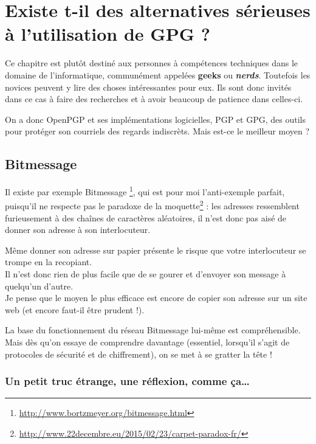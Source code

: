 \chapter{Existe t-il des alternatives sérieuses à l'utilisation de GPG ?}

\begin{notice}
	Ce chapitre est plutôt destiné aux personnes à compétences
	techniques dans le domaine de l'informatique, communément appelées
\textbf{geeks} ou \textbf{\emph{nerds}}. Toutefois les novices peuvent
y lire des choses intéressantes pour eux. Ils sont donc invités dans ce
cas à faire des recherches et à avoir beaucoup de patience dans
celles-ci.
\end{notice}


On a donc OpenPGP et ses implémentations logicielles, PGP et GPG, des
outils pour protéger son courriels des regards indiscrèts. Mais est-ce
le meilleur moyen ?

\section{Bitmessage}\label{bitmessage}

Il existe par exemple Bitmessage
\footnote{\url{http://www.bortzmeyer.org/bitmessage.html}}, qui est
pour moi l'anti-exemple parfait, puisqu'il ne respecte pas le
paradoxe de la moquette\footnote{\url{http://www.22decembre.eu/2015/02/23/carpet-paradox-fr/}} : les adresses ressemblent furieusement à des chaînes de
caractères aléatoires, il n'est donc pas aisé de donner son adresse à son interlocuteur.

Même donner son adresse sur papier présente le risque que votre interlocuteur se trompe en la recopiant.\\Il n'est donc rien de plus
facile que de se gourer et d'envoyer son message à quelqu'un d'autre.\\Je pense que le moyen le plus efficace est encore de copier
son adresse sur un site web (et encore faut-il être prudent !).

La base du fonctionnement du réseau Bitmessage lui-même est compréhensible. Mais dès qu'on essaye de comprendre davantage
(essentiel, lorsqu'il s'agit de protocoles de sécurité et de chiffrement), on se met à se gratter la tête !

\subsection{Un petit truc étrange, une réflexion, comme ça\ldots{}}\label{un-petit-truc-uxe9trange-une-ruxe9flexion-comme-uxe7a}

